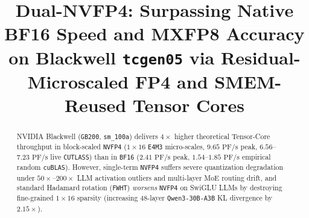 \documentclass[conference,10pt]{IEEEtran}
\title{Dual-NVFP4: Surpassing Native BF16 Speed and MXFP8 Accuracy on Blackwell \texttt{tcgen05} via Residual-Microscaled FP4 and SMEM-Reused Tensor Cores}
\author{\IEEEauthorblockN{Rishi Vinodkumar}}
\begin{document}
\maketitle

\begin{abstract}
NVIDIA Blackwell (\texttt{GB200}, \texttt{sm\_100a}) delivers $4\times$ higher theoretical Tensor-Core throughput in block-scaled \texttt{NVFP4} ($1{\times}16$ \texttt{E4M3} micro-scales, $9.65\text{ PF/s}$ peak, $6.56$--$7.23\text{ PF/s}$ live \texttt{CUTLASS}) than in \texttt{BF16} ($2.41\text{ PF/s}$ peak, $1.54$--$1.85\text{ PF/s}$ empirical random \texttt{cuBLAS}). However, single-term \texttt{NVFP4} suffers severe quantization degradation under $50\times$--$200\times$ LLM activation outliers and multi-layer MoE routing drift, and standard Hadamard rotation (\texttt{FWHT}) \emph{worsens} \texttt{NVFP4} on SwiGLU LLMs by destroying fine-grained $1{\times}16$ sparsity (increasing 48-layer \texttt{Qwen3-30B-A3B} KL divergence by $2.15\times$).


\end{abstract}
\end{document}
